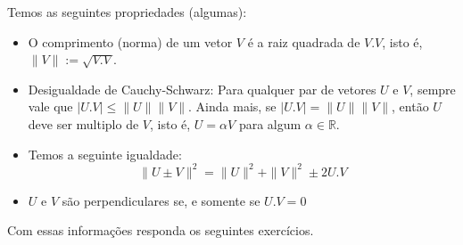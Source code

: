 \documentclass{article}
\theoremstyle{plain}
\theoremstyle{definition}
\theoremstyle{remark}
\newcommand{\R}{{\mathbb R}}
\begin{document}
Temos as seguintes propriedades (algumas):
\begin{itemize}
  \item O comprimento (norma) de um vetor $V$ é a raiz quadrada de $V.V$, isto é, $\|V\|:=\sqrt{V.V}$. 
  \item Desigualdade de Cauchy-Schwarz: Para qualquer par de vetores $U$ e $V$,  sempre vale que 
  $|U.V|\leq \|U\|\|V\|$. 
  Ainda mais, se $|U.V|=\|U\|\|V\|$, então $U$ deve ser multiplo de $V$, 
  isto é, $U=\alpha V$ para algum $\alpha\in \R$.
  \item Temos a seguinte igualdade:
  $$ \|U\pm V\|^{2}=\|U\|^{2}+\|V\|^{2}\pm 2 U.V $$
  \item $U$ e $V$ são perpendiculares se, e somente se $U.V=0$
\end{itemize}
  Com essas informações responda os seguintes exercícios.
\end{document}

